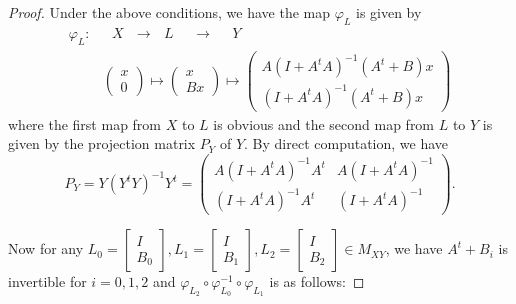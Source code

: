 \documentclass{article}
\begin{document}
\begin{proof}
Under the above conditions, we have the map $\varphi_{L}$ is given by
\begin{align*}
\varphi_{L} : & ~  ~   ~ X  ~  ~   ~ \longrightarrow  ~  ~   ~ L  ~  ~   ~ ~  ~   ~\longrightarrow ~  ~   ~ ~  ~   ~ Y\\
 ~ ~ & \left(
\begin{array}{cc}
x \\
0 \end{array} \right) \mapsto  \left(
\begin{array}{cc}
x \\
Bx \end{array} \right) \mapsto  \left(
\begin{array}{cc}
A(I+A^tA)^{-1}(A^t+B)x \\
(I+A^tA)^{-1}(A^t+B)x \end{array} \right)
\end{align*}
where the first map from $X$ to $L$ is obvious and the second map from $L$ to $Y$ is given by the projection matrix $P_Y$ of $Y$. By direct computation, we have
\[
P_Y=Y(Y^tY)^{-1}Y^t=\left(
\begin{array}{cc}
A(I+A^tA)^{-1}A^t & A(I+A^tA)^{-1}\\
(I+A^tA)^{-1}A^t & (I+A^tA)^{-1}\end{array} \right).
\]

Now for any  $L_0=\left[
\begin{array}{cc}
I \\
B_0 \end{array} \right], L_1=\left[
\begin{array}{cc}
I \\
B_1 \end{array} \right], L_2=\left[
\begin{array}{cc}
I \\
B_2 \end{array} \right] \in M_{XY}$, we have $A^t+B_i$ is invertible for $i=0,1,2$ and $\varphi_{L_2}\circ \varphi_{L_0}^{-1}\circ \varphi_{L_1}$ is as follows:



\end{proof}
\end{document}
